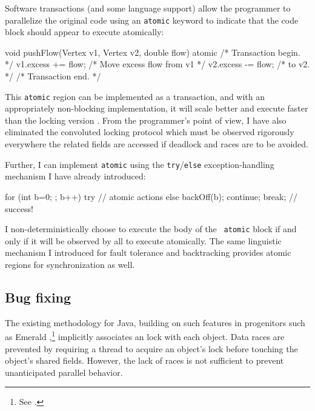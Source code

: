 Software transactions (and some language support) allow the
programmer to parallelize the original code using an \texttt{atomic}
keyword to indicate that the code block should appear to execute
atomically: 
\begin{inlinecode}
void pushFlow(Vertex v1, Vertex v2, double flow) {
  atomic { /* Transaction begin. */
    v1.excess += flow; /* Move excess flow from v1 */
    v2.excess -= flow; /* to v2.                   */
  } /* Transaction end. */
}
\end{inlinecode}

This {\tt atomic} region can be implemented as a transaction, and
with an appropriately non-blocking implementation, it
will scale better and execute faster than the locking version
\cite{AnanianAsKuLeLi05,HarrisFr03,GreenwaldCh96,MassalinPu91,HerlihyMo93,ShavitTo95}.
From the programmer's point of view, I have also eliminated the
convoluted locking protocol which must
be observed rigorously everywhere the related fields are accessed if
deadlock and races are to be avoided.

Further, I can implement {\tt atomic} using the {\tt try}/{\tt else}
exception-handling mechanism I have already introduced:
\begin{inlinecode}
for (int b=0; ; b++) {
  try {
    // atomic actions
  } else {
    backOff(b);
    continue;
  }
  break; // success!
}
\end{inlinecode}

I non-deterministically choose to execute the body of the {\tt
  atomic} block if and only if it will be observed by all to execute
atomically.  The same linguistic mechanism I introduced for
fault tolerance and backtracking provides atomic regions for
synchronization as well.

\subsection{Bug fixing}\label{sec:stringbuffer}
The existing  methodology for Java,
building on such features in progenitors such as Emerald
\cite{BlackHuJuLe86,JulSt91},\footnote{See .}
implicitly associates an 
lock with each object.
Data races are prevented by
requiring a thread to acquire an
object's lock before touching the object's shared fields.
However, the lack of races is not sufficient to prevent unanticipated
parallel behavior.

